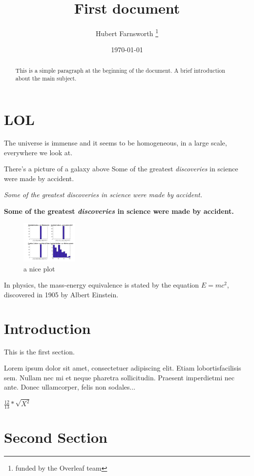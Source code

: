 \documentclass{article}
\title{First document}
\author{Hubert Farnsworth \thanks{funded by the Overleaf team}}
\date{\today}
\begin{document}
	\begin{abstract}
		This is a simple paragraph at the beginning of the 
		document. A brief introduction about the main subject.
	\end{abstract}


	\tableofcontents

	\section{LOL}
	The universe is immense and it seems to be homogeneous, 
	in a large scale, everywhere we look at.
	
	
	There's a picture of a galaxy above
	Some of the greatest \emph{discoveries} 
	in science 
	were made by accident.
	
	\textit{Some of the greatest \emph{discoveries} 
		in science 
		were made by accident.}
	
	\textbf{Some of the greatest \emph{discoveries} 
		in science 
		were made by accident.}
	\begin{figure}[h]
		\centering
		\includegraphics[width=0.25\textwidth]{comp7}
		\caption{a nice plot}
		\label{fig:mesh1}
	\end{figure}
	In physics, the mass-energy equivalence is stated 
	by the equation $E=mc^2$, discovered in 1905 by Albert Einstein.
	
	\section{Introduction}
	
	This is the first section.
	
	Lorem  ipsum  dolor  sit  amet,  consectetuer  adipiscing  
	elit.   Etiam  lobortisfacilisis sem.  Nullam nec mi et 
	neque pharetra sollicitudin.  Praesent imperdietmi nec ante. 
	Donec ullamcorper, felis non sodales...
	
	$\frac{12}{13}*\sqrt{X^{2}}$
	
	\section{Second Section}
	
\end{document}
